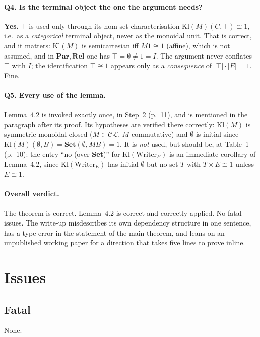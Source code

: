 \documentclass[11pt]{article}
\newcommand{\Kl}{\mathrm{Kl}}
\newcommand{\Set}{\mathbf{Set}}
\newcommand{\CL}{\mathcal{CL}}
\begin{document}
\paragraph{Q4. Is the terminal object the one the argument needs?} \textbf{Yes.} $\top$
is used only through its hom-set characterisation $\Kl(M)(C,\top)\cong1$, i.e.\ as a
\emph{categorical} terminal object, never as the monoidal unit. That is correct,
and it matters: $\Kl(M)$ is semicartesian iff $M1\cong1$ (affine), which is not
assumed, and in $\mathbf{Par},\mathbf{Rel}$ one has $\top=\emptyset\ne 1=I$. The argument
never conflates $\top$ with $I$; the identification $\top\cong1$ appears only as a
\emph{consequence} of $|\top|\cdot|E|=1$. Fine.

\paragraph{Q5. Every use of the lemma.} Lemma~4.2 is invoked exactly once, in
Step~2 (p.~11), and is mentioned in the paragraph after its proof. Its hypotheses
are verified there correctly: $\Kl(M)$ is symmetric monoidal closed ($M\in\CL$,
$M$ commutative) and $\emptyset$ is initial since $\Kl(M)(\emptyset,B)=\Set(\emptyset,MB)=1$. It is
\emph{not} used, but should be, at Table~1 (p.~10): the entry ``no (over
\textbf{Set})'' for $\Kl(\mathrm{Writer}_E)$ is an immediate corollary of Lemma~4.2,
since $\Kl(\mathrm{Writer}_E)$ has initial $\emptyset$ but no set $T$ with $T\times E\cong1$
unless $E\cong1$.

\paragraph{Overall verdict.} The theorem is correct. Lemma~4.2 is correct and
correctly applied. No fatal issues. The write-up misdescribes its own dependency
structure in one sentence, has a type error in the statement of the main theorem,
and leans on an unpublished working paper for a direction that takes five lines to
prove inline.

\section*{Issues}

\subsection*{Fatal}
None.
\end{document}
